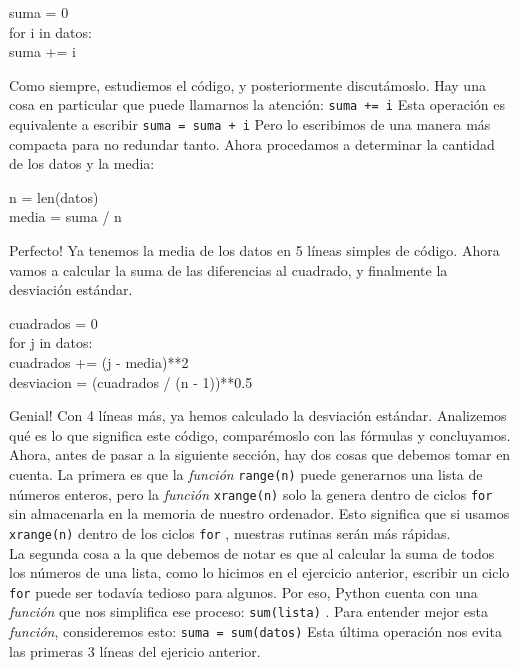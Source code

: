\documentclass[10pt,letterpaper]{article}
\newcommand{\inlinecode}[1]{
\colorbox{light-gray}{\texttt{#1}}
}
\newenvironment{Code}
{
\begin{lrbox}{\selvestebox}%
\begin{minipage}{\dimexpr\columnwidth-2\fboxsep\relax}
\fontfamily{\ttdefault}\selectfont
}
{\end{minipage}\end{lrbox}%
\begin{center}
\colorbox{light-gray}{\usebox{\selvestebox}}
\end{center}
}
\begin{document}
\begin{Code}
suma = 0\\
for i in datos:\\
\hspace*{4mm} suma += i
\end{Code}

Como siempre, estudiemos el c\'odigo, y posteriormente discut\'amoslo. Hay una cosa en particular que puede llamarnos la atenci\'on: \inlinecode{suma += i} Esta operaci\'on es equivalente a escribir \inlinecode{suma = suma + i} Pero lo escribimos de una manera m\'as compacta para no redundar tanto. Ahora procedamos a determinar la cantidad de los datos y la media:

\begin{Code}
n = len(datos)\\
media = suma / n
\end{Code}

Perfecto! Ya tenemos la media de los datos en 5 l\'ineas simples de c\'odigo. Ahora vamos a calcular la suma de las diferencias al cuadrado, y finalmente la desviaci\'on est\'andar.

\begin{Code}
cuadrados = 0\\
for j in datos:\\
\hspace*{4mm} cuadrados += (j - media)**2\\
desviacion = (cuadrados / (n - 1))**0.5
\end{Code}

Genial! Con 4 l\'ineas m\'as, ya hemos calculado la desviaci\'on est\'andar. Analizemos qu\'e es lo que significa este c\'odigo, compar\'emoslo con las f\'ormulas y concluyamos.\\

Ahora, antes de pasar a la siguiente secci\'on, hay dos cosas que debemos tomar en cuenta. La primera es que la \emph{funci\'on} \inlinecode{range(n)} puede generarnos una lista de n\'umeros enteros, pero la \emph{funci\'on} \inlinecode{xrange(n)} solo la genera dentro de ciclos \inlinecode{for} sin almacenarla en la memoria de nuestro ordenador. Esto significa que si usamos \inlinecode{xrange(n)} dentro de los ciclos \inlinecode{for}, nuestras rutinas ser\'an m\'as r\'apidas.\\

La segunda cosa a la que debemos de notar es que al calcular la suma de todos los n\'umeros de una lista, como lo hicimos en el ejercicio anterior, escribir un ciclo \inlinecode{for} puede ser todav\'ia tedioso para algunos. Por eso, Python cuenta con una \emph{funci\'on} que nos simplifica ese proceso: \inlinecode{sum(lista)}. Para entender mejor esta \emph{funci\'on}, consideremos esto: \inlinecode{suma = sum(datos)} Esta \'ultima operaci\'on nos evita las primeras 3 l\'ineas del ejericio anterior.
\end{document}
